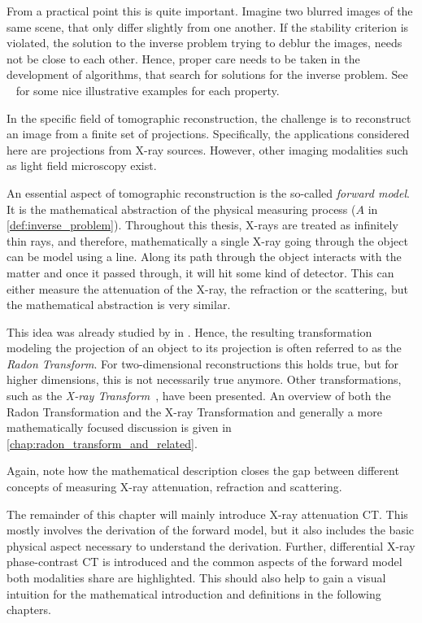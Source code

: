 From a practical point this is quite important. Imagine two blurred images of the same scene, that
only differ slightly from one another. If the stability criterion is violated, the solution to the
inverse problem trying to deblur the images, needs not be close to each other. Hence, proper care
needs to be taken in the development of algorithms, that search for solutions for the inverse
problem. See \citeauthor{hansen_discrete_2010}~\cite{hansen_discrete_2010} for some nice
illustrative examples for each property.

In the specific field of tomographic reconstruction, the challenge is to reconstruct an image from a
finite set of projections. Specifically, the applications considered here are projections from X-ray
sources. However, other imaging modalities such as light field microscopy exist.

An essential aspect of tomographic reconstruction is the so-called \textit{forward model}. It is the
mathematical abstraction of the physical measuring process (\(A\) in \autoref{def:inverse_problem}).
Throughout this thesis, X-rays are treated as infinitely thin rays, and therefore, mathematically a
single X-ray going through the object can be model using a line. Along its path through the object
interacts with the matter and once it passed through, it will hit some kind of detector. This can
either measure the attenuation of the X-ray, the refraction or the scattering, but the mathematical
abstraction is very similar.

This idea was already studied by \citeauthor{radon_uber_1917} in \citeyear{radon_uber_1917}. Hence,
the resulting transformation modeling the projection of an object to its projection is often
referred to as the \textit{Radon Transform}. For two-dimensional reconstructions this holds true,
but for higher dimensions, this is not necessarily true anymore. Other transformations, such as the
\textit{X-ray Transform}~\cite{solmon_x-ray_1976}, have been presented. An overview of both the
Radon Transformation and the X-ray Transformation and generally a more mathematically focused
discussion is given in \autoref{chap:radon_transform_and_related}.

Again, note how the mathematical description closes the gap between different concepts of
measuring X-ray attenuation, refraction and scattering.

The remainder of this chapter will mainly introduce X-ray attenuation CT\@. This mostly involves the
derivation of the forward model, but it also includes the basic physical aspect necessary to
understand the derivation. Further, differential X-ray phase-contrast CT is introduced and the
common aspects of the forward model both modalities share are highlighted. This should also help to
gain a visual intuition for the mathematical introduction and definitions in the following chapters.

